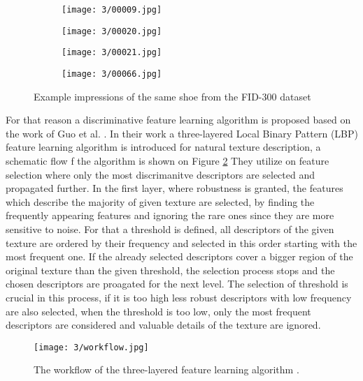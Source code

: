 \documentclass[draft,final]{vutinfth} %
\begin{document}
\begin{figure}[h]
  \centering
  \begin{subfigure}[b]{0.24\columnwidth}
    \centering
    \texttt{[image: 3/00009.jpg]}
  \end{subfigure}
  \begin{subfigure}[b]{0.24\columnwidth}
    \centering
    \texttt{[image: 3/00020.jpg]}
  \end{subfigure}
  \begin{subfigure}[b]{0.24\columnwidth}
    \centering
    \texttt{[image: 3/00021.jpg]}
  \end{subfigure}
  \begin{subfigure}[b]{0.24\columnwidth}
    \centering
    \texttt{[image: 3/00066.jpg]}
  \end{subfigure}
  \caption{Example impressions of the same shoe from the FID-300 \cite{kortylewski2014unsupervised} dataset}
  \label{fig:pe:database}
\end{figure}

\par
For that reason a discriminative feature learning algorithm is proposed based on the work of Guo et al. \cite{guo2012discriminative}.
In their work a three-layered Local Binary Pattern (LBP) feature learning algorithm is introduced for natural texture description, a schematic flow f the algorithm is shown on Figure \ref{fig:pe:workflow}
They utilize on feature selection where only the most discrimanitve descriptors are selected and propagated further.
In the first layer, where robustness is granted, the features which describe the majority of given texture are selected, by finding the frequently appearing features and ignoring the rare ones since they are more sensitive to noise.
For that a threshold is defined, all descriptors of the given texture are ordered by their frequency and selected in this order starting with the most frequent one.
If the already selected descriptors cover a bigger region of the original texture than the given threshold, the selection process stops and the chosen descriptors are proagated for the next level.
The selection of threshold is crucial in this process, if it is too high less robust descriptors with low frequency are also selected, when the threshold is too low, only the most frequent descriptors are considered and valuable details of the texture are ignored.

\begin{figure}[h]
  \centering
  \texttt{[image: 3/workflow.jpg]}
  \caption{The workflow of the three-layered feature learning algorithm  \cite{guo2012discriminative}.}
  \label{fig:pe:workflow} %
\end{figure}
\end{document}
